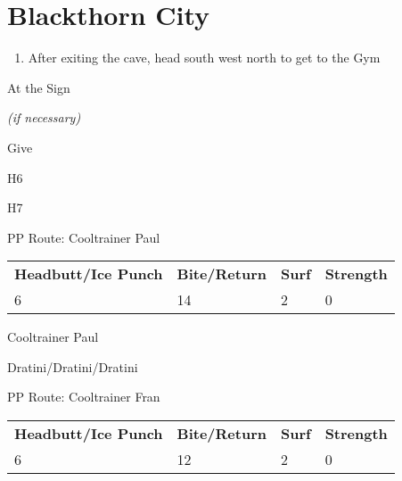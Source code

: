 \chapter{Blackthorn City}
\vspace{0.5mm}

\begin{paracol}{2}
\begin{enumerate}
	\item After exiting the cave, head south \pointRight{} west \pointRight{} north to get to the Gym
\end{enumerate}

\begin{menu}{At the Sign}
	\varwb
	\begin{packMenu}
		\item \superRepel
		\small{\item \superPotion{} \textit{(if necessary)}}
		\item \textbf{\pinkBow{}} \pointRight{} Give 
		\item \menuHlTwo{(\pointLeft{})} H6 \whirlpool{} 
		\item \menuHlTwo{(\pointLeft{})} H7 \waterfall{} 
	\end{packMenu}
	\varwe
\end{menu}

\switchcolumn*
\alignBoxes
\begin{misc}{PP Route: Cooltrainer Paul}
	\varwb
	\begin{tabu} to \textwidth {X[6,c] X[5,c] X[4,c] X[4,c]}
		\textbf{Headbutt/Ice Punch} & \textbf{Bite/Return} & \textbf{Surf} & \textbf{Strength}\\ 
		6 & 14 & 2 & 0
	\end{tabu}
	\varwe
\end{misc}

\switchcolumn
\begin{trainer}{Cooltrainer Paul}
	\varwb
	\begin{fightSection}{Dratini/Dratini/Dratini}
		\item {} \return{} 
	\end{fightSection}
	\varwe
\end{trainer}

\switchcolumn*
\begin{misc}{PP Route: Cooltrainer Fran}
	\varwb
	\begin{tabu} to \textwidth {X[6,c] X[5,c] X[4,c] X[4,c]}
		\textbf{Headbutt/Ice Punch} & \textbf{Bite/Return} & \textbf{Surf} & \textbf{Strength}\\ 
		6 & 12 & 2 & 0
	\end{tabu}
	\varwe
\end{misc}


\end{paracol}
